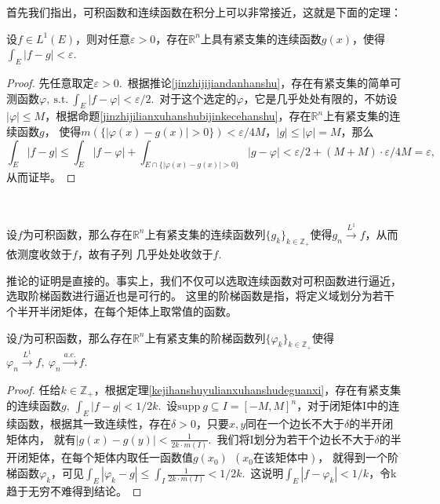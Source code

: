 \documentclass[color=green,thmcnt=section,lang=cn,12pt]{elegantbook}
\numberwithin{equation}{section}%
\numberwithin{figure}{section}%
\newcommand{\RR}{\mathbb{R}}
\renewcommand{\RN}{\RR^n}
\newcommand{\ZZ}{\mathbb{Z}}
\newcommand{\ee}{\varepsilon}
\newcommand{\sothat}{\ \textrm{s.t.}\ }
\newcommand{\csf}[1]{\{#1_k\}_{k\in \ZZ_+}} %
\begin{document}
首先我们指出，可积函数和连续函数在积分上可以非常接近，这就是下面的定理：
\begin{theorem}\label{kejihanshuyulianxuhanshudeguanxi}
    设$f\in L^1(E)$，则对任意$\ee>0$，存在$\RN$上具有紧支集的连续函数$g(x)$，使得$\int_E|f-g|<\ee$.\ 
\end{theorem}
\begin{proof}
    先任意取定$\ee>0$.\ 根据推论\ref{jinzhijijiandanhanshu}，存在有紧支集的简单可测函数$\varphi,\sothat \int_E|f-\varphi|<\ee/2$.\ 
    对于这个选定的$\varphi$，它是几乎处处有限的，不妨设$|\varphi|\leq M$，根据命题\ref{jinzhijilianxuhanshubijinkecehanshu}，存在$\RN$上有紧支集的连续函数$g$，
    使得$m(\{|\varphi(x)-g(x)|>0\})<\ee/4M$，$|g|\leq |\varphi|=M$，那么\begin{equation*}
        \int_E|f-g|\leq \int_E|f-\varphi|+\int_{E\cap\{|\varphi(x)-g(x)|>0\}}|g-\varphi| <\ee/2+(M+M)\cdot \ee/4M=\ee,
    \end{equation*}
    从而证毕。
\end{proof}
\ 


\begin{corollary}\label{jinzhijilianxuhanshubijinkejihanshu}
    设$f$为可积函数，那么存在$\RN$上有紧支集的连续函数列$\csf{g}$使得$g_n\xrightarrow{L^1}f$，从而依测度收敛于$f$，故有子列
    几乎处处收敛于$f$.\ 
\end{corollary}
推论的证明是直接的。事实上，我们不仅可以选取连续函数对可积函数进行逼近，选取阶梯函数进行逼近也是可行的。
这里的阶梯函数是指，将定义域划分为若干个半开半闭矩体，在每个矩体上取常值的函数。
\begin{proposition}\label{jietihanshulie}
    设$f$为可积函数，那么存在$\RN$上有紧支集的阶梯函数列$\csf{\varphi}$使得$\varphi_n\xrightarrow{L^1}f,\ \varphi_n\xrightarrow{a.e.}f$.\ 
\end{proposition}
\begin{proof}
    任给$k\in\ZZ_+$，根据定理\ref{kejihanshuyulianxuhanshudeguanxi}，存在有紧支集的连续函数$g,\ \int_E|f-g|<1/2k$.\ 
    设$\textrm{supp}\ g\subseteq I=[-M,M]^n$，对于闭矩体I中的连续函数，根据其一致连续性，存在$\delta>0$，只要$x,y$同在一个边长不大于$\delta$的半开闭矩体内，
    就有$|g(x)-g(y)|<\frac{1}{2k\cdot m(I)}$.\ 我们将I划分为若干个边长不大于$\delta$的半开闭矩体，在每个矩体内取任一函数值$g(x_0)\ \ (x_0\mbox{在该矩体中})$，
    就得到一个阶梯函数$\varphi_k$，可见$\int_E|\varphi_k-g|\leq \int_I \frac{1}{2k\cdot m(I)}<1/2k.$\ 这说明$\int_E|f-\varphi_k|<1/k$，令k趋于无穷不难得到结论。
\end{proof}
\ 
\end{document}

